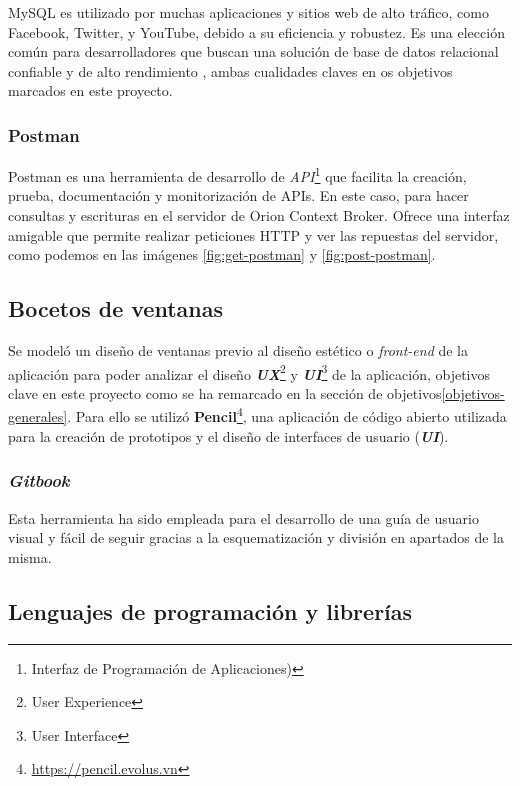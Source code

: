 MySQL es utilizado por muchas aplicaciones y sitios web de alto tráfico, como Facebook, Twitter, y YouTube, debido a su eficiencia y robustez. Es una elección común para desarrolladores que buscan una solución de base de datos relacional confiable y de alto rendimiento \cite{mysqlcookbook}, ambas cualidades claves en os objetivos marcados en este proyecto.

\subsubsection{Postman}\label{postman}

Postman es una herramienta de desarrollo de \textit{API}\footnote{Interfaz de Programación de Aplicaciones)} que facilita la creación, prueba, documentación y monitorización de APIs. En este caso, para hacer consultas y escrituras en el servidor de Orion Context Broker. Ofrece una interfaz amigable que permite realizar peticiones HTTP y ver las repuestas del servidor, como podemos en las imágenes \ref{fig:get-postman} y \ref{fig:post-postman}.

\subsection{Bocetos de ventanas}

Se modeló un diseño de ventanas previo al diseño estético o \textit{front-end} de la aplicación para poder analizar el diseño \textbf{\textit{UX}}\footnote{User Experience} y \textbf{\textit{UI}}\footnote{User Interface} de la aplicación, objetivos clave en este proyecto como se ha remarcado en la sección de objetivos\ref{objetivos-generales}. Para ello se utilizó \textbf{Pencil}\footnote{\url{https://pencil.evolus.vn}}, una aplicación de código abierto utilizada para la creación de prototipos y el diseño de interfaces de usuario (\textbf{\textit{UI}}).

\subsubsection{\textit{Gitbook}}
Esta herramienta ha sido empleada para el desarrollo de una guía de usuario visual y fácil de seguir gracias a la esquematización y división en apartados de la misma.


\subsection{Lenguajes de programación y librerías}

